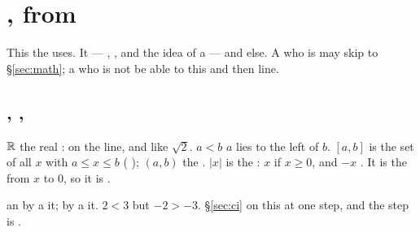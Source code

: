 \section{ , from  }
\label{sec:notation}

This    the  uses. It   --- ,
, and the idea of a  --- and  else. A  who is
 may skip to §\ref{sec:math}; a  who is not  be able to 
this  and then    line.

\subsection{, , }

$\mathbb{R}$  the real :  on the  line,  
and  like $\sqrt 2$. $a<b$  $a$ lies to the left of $b$.
$[a,b]$ is the set of all $x$ with $a \le x \le b$ ( );
$(a,b)$  the . $|x|$ is the \emph{ }: $x$ if
$x \ge 0$, and $-x$ . It is the  from $x$ to $0$, so it is 
.

  an  by a \emph{}
  it;  by a \emph{}  \textbf{}
it. $2<3$ but $-2>-3$. §\ref{sec:ci}  on this at one  step, and
the step is  .

\subsection{}

